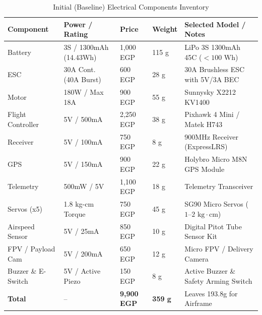 \documentclass[12pt,a4paper]{article}
\begin{document}
\begin{table}[H]
\centering
\caption{Initial (Baseline) Electrical Components Inventory}
\label{tab:baseline_inventory}
\footnotesize
\setlength{\tabcolsep}{3pt}
\begin{tabularx}{\textwidth}{@{}p{3.0cm} p{2.8cm} p{1.8cm} p{1.4cm} X@{}}
\toprule
\textbf{Component} & \textbf{Power / Rating} & \textbf{Price} & \textbf{Weight} & \textbf{Selected Model / Notes} \\ \midrule
Battery            & 3S / 1300mAh (14.43Wh) & 1,000 EGP & 115 g & LiPo 3S 1300mAh 45C ($<100\text{ Wh}$) \\
ESC                & 30A Cont. (40A Burst)  & 600 EGP   & 28 g  & 30A Brushless ESC with 5V/3A BEC \\
Motor              & 180W / Max 18A         & 900 EGP   & 55 g  & Sunnysky X2212 KV1400 \\
Flight Controller  & 5V / 500mA             & 2,250 EGP & 38 g  & Pixhawk 4 Mini / Matek H743 \\
Receiver           & 5V / 100mA             & 750 EGP   & 8 g   & 900MHz Receiver (ExpressLRS) \\
GPS                & 5V / 150mA             & 900 EGP   & 22 g  & Holybro Micro M8N GPS Module \\
Telemetry          & 500mW / 5V             & 1,100 EGP & 18 g  & Telemetry Transceiver \\
Servos (x5)        & 1.8 kg-cm Torque       & 750 EGP   & 45 g  & SG90 Micro Servos ($1\text{--}2\text{ kg}\cdot\text{cm}$) \\
Airspeed Sensor    & 5V / 25mA              & 850 EGP   & 10 g  & Digital Pitot Tube Sensor Kit \\
FPV / Payload Cam  & 5V / 200mA             & 650 EGP   & 12 g  & Micro FPV / Delivery Camera \\
Buzzer \& E-Switch & 5V / Active Piezo      & 150 EGP   & 8 g   & Active Buzzer \& Safety Arming Switch \\ \midrule
\textbf{Total}     & --                     & \textbf{9,900 EGP} & \textbf{359 g} & Leaves 193.8g for Airframe \\ \bottomrule
\end{tabularx}
\end{table}
\end{document}
